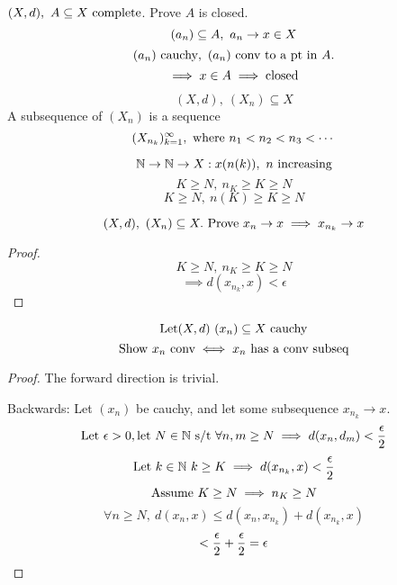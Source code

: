 \documentclass[12pt]{article}
\begin{document}

\bboxexam
\begin{exam}
    \((X,d),\ A\subseteq X\text{ complete}\).
    Prove \(A\) is closed.
    \[
        (a_n)\subseteq A,\ a_n\to x\in X
    \]
    \[
        (a_n)\text{ cauchy},\
        (a_n)\ \text{conv to a pt in }A.
    \]
    \[
        \implies x \in A\implies \text{closed}
    \]
\end{exam}
\ebox

\bboxdefn
\begin{defn}[Subsequence]
    \[
        (X,d),\ (X_n)\subseteq X
    \]
    A subsequence of \((X_n)\) is a sequence 
    \[
        (X_{n_k})_{k=1}^\infty,\ \TR{where}\ 
        n_1 < n_2 < n_3 < \cdots
    \]
    \bboxnote
    \begin{note}
        \[
            \mathbb{N}\rightarrow\mathbb{N}\rightarrow X : x(n(k)),\ n\text{ increasing}
        \]
        \[
            K\ge N,\ n_K\ge K\ge N
        \]
        \[
            K\ge N,\ n(K)\ge K\ge N
        \]
    \end{note}
    \ebox
\end{defn}
\ebox

\bboxexam
\begin{exam}
    \[
        (X,d),\ (X_n)\subseteq X.\ 
        \T{Prove}\ x_n\to x
        \implies x_{n_k}\to x
    \]
    \bboxproof
    \begin{proof}
        \[
            K\ge N,\ n_K\ge K\ge N
        \]
        \[
            \implies d(x_{n_k},x)<\epsilon
        \]
    \end{proof}
    \ebox
\end{exam}
\ebox

\bboxexam
\begin{exam}
    \[
        \mathrm{Let} (X,d)\ (x_n)\subseteq X\text{ cauchy}
    \]
    \[
        \text{Show }x_n\text{ conv}\iff x_n \text{ has a conv subseq}
    \]
    \bboxproof
    \begin{proof}
        The forward direction is trivial.

        Backwards: Let \((x_n)\) be cauchy, and let
        some subsequence \(x_{n_k}\to x\).
        \[
            \text{Let}\ \epsilon > 0,
            \text{let}\ N\in\mathbb N\text{ s/t }
            \forall n,m\ge N
            \implies d(x_n,d_m)<\frac{\epsilon}2
        \]
        \[
            \mathrm{Let}\ k\in\mathbb N\ k\ge K
            \implies d(x_{n_k},x)<\frac{\epsilon}2
        \]
        \[
            \text{Assume}\ K\ge N\implies n_K\ge N
        \]
        \[
            \forall n\ge N,\ d(x_n,x)\le
            d(x_n,x_{n_k})+d(x_{n_k},x)
        \]
        \[
            <\frac{\epsilon}2+\frac{\epsilon}2=\epsilon
        \]
    \end{proof}
    \ebox
\end{exam}
\ebox
\end{document}
